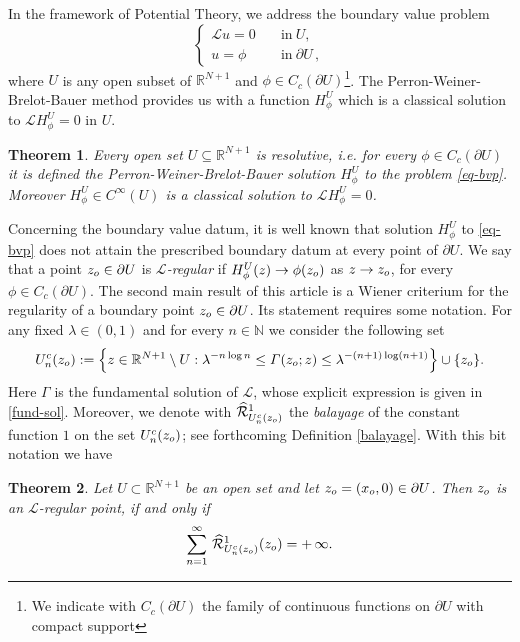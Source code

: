 \documentclass{amsart}
\newtheorem{thm}{Theorem}[section]
\numberwithin{equation}{section}
\def \R {{\mathbb {R}}}
\def \p{{\phi}}
\def \Lc{{\mathcal{L}}}
\def \r{{\mathbb{R}}}
\def \balayage{{\widehat{\mathcal{R}}}}
\renewcommand{\Gamma}{\varGamma}
\begin{document}
In the framework of  Potential Theory, we address the boundary value problem
\begin{equation} \label{eq-bvp}
 	\begin{cases}
 	\Lc u   = 0 & \quad \text{in} \ U,\\
         u = \p & \quad \text{in} \  \partial U\,,
 \end{cases}
\end{equation}
where $U$ is any open subset of $\R^{N+1}$ and $\p \in {C}_c(\partial U)$\footnote{We indicate with ${C}_c(\partial U)$ the family of continuous functions on $\partial U$ with compact support}. The Perron-Weiner-Brelot-Bauer method provides us with a function $H^U_\p$ which is a classical solution to $\Lc H^U_\p = 0$ in $U$. 


\begin{thm}
\label{main result}
Every open set $U \subseteq \R^{N+1}$ is resolutive, i.e. for every $\p \in {C}_c(\partial U)$ it is defined the {Perron-Weiner-Brelot-Bauer} solution $H^U_\p$ to the problem \eqref{eq-bvp}. Moreover $H^U_\p \in C^{\infty}(U)$ is a classical solution to $\Lc H^U_\p = 0$.
\end{thm}

Concerning the boundary value datum, it is well known that solution $H^U_\p$ to \eqref{eq-bvp} does not attain the prescribed boundary datum at every point of $\partial U$. We say that a point $z_{\rm o} \in \partial U$ is \textit{$\Lc$-regular} if $H^U_\p(z) \to \p(z_{\rm o})$ as $z \to z_{\rm o}$, for every $\p \in {C}_c(\partial U)$. 
The second main result of this article is a Wiener criterium for the regularity of a boundary point $z_{\rm o} \in \partial U$. Its statement requires some notation. For any fixed $\lambda \in (0,1)$ and for every $n \in \mathbb{N}$ we consider the following set
\begin{equation}
	\label{level set}
U^c_n(z_{\rm o}):= \Big\{z \in \r^{N+1} \setminus U :  \lambda^{-n\log n} 
\leq {\Gamma(z_{\rm o};z)} \leq \lambda^{-(n+1)\log(n+1)}\Big\} \cup \{z_{\rm o}\}.
\end{equation}
Here $\Gamma$ is the fundamental solution of $\Lc$, whose explicit expression is given in \eqref{fund-sol}. Moreover, {we denote with} $\balayage^1_{U^c_n(z_{\rm o})}$ %
the \textit{balayage} of the constant function $1$ on the set $U^c_n(z_{\rm o})$; see {forthcoming} Definition \ref{balayage}. With this bit notation we have
\begin{thm}
\label{main result2}
	Let $U \subset \r^{N+1}$ be an open set and let ${z_{\rm o}=(x_{\rm o},0)} \in \partial U$. Then $z_{\rm o}$ is an $\Lc$-regular point, if and only if
$$
 \sum_{n =1}^{\infty} \, \balayage^1_{U^c_n(z_{\rm o})}(z_{\rm o}) = + \, \infty.
$$
\end{thm}
\end{document}
